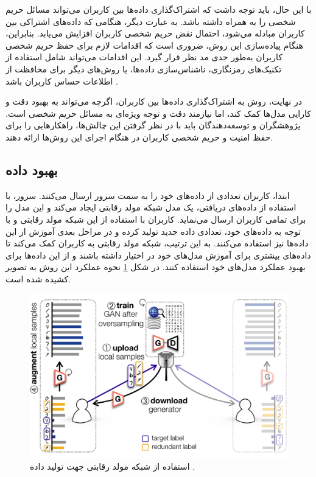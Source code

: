 با این حال، باید توجه داشت که اشتراک‌گذاری داده‌ها بین کاربران می‌تواند مسائل حریم شخصی را به همراه داشته باشد. به عبارت دیگر، هنگامی که داده‌های اشتراکی بین کاربران مبادله می‌شود، احتمال نقض حریم شخصی کاربران افزایش می‌یابد. بنابراین، هنگام پیاده‌سازی این روش، ضروری است که اقدامات لازم برای حفظ حریم شخصی کاربران به‌طور جدی مد نظر قرار گیرد. این اقدامات می‌تواند شامل استفاده از تکنیک‌های رمزنگاری، ناشناس‌سازی داده‌ها، یا روش‌های دیگر برای محافظت از اطلاعات حساس کاربران باشد
\cite{ma2022state}.

در نهایت، روش به اشتراک‌گذاری داده‌ها بین کاربران، اگرچه می‌تواند به بهبود دقت و کارایی مدل‌ها کمک کند، اما نیازمند دقت و توجه ویژه‌ای به مسائل حریم شخصی است. پژوهشگران و توسعه‌دهندگان باید با در نظر گرفتن این چالش‌ها، راهکارهایی را برای حفظ امنیت و حریم شخصی کاربران در هنگام اجرای این روش‌ها ارائه دهند.

\subsection{
	بهبود داده
}
ابتدا، کاربران تعدادی از داده‌های خود را به سمت سرور ارسال می‌کنند. سرور، با استفاده از داده‌های دریافتی، یک مدل شبکه مولد رقابتی%
ایجاد می‌کند و این مدل را برای تمامی کاربران ارسال می‌نماید. کاربران با استفاده از این شبکه مولد رقابتی و با توجه به داده‌های خود، تعدادی داده جدید تولید کرده و در مراحل بعدی آموزش از این داده‌ها نیز استفاده می‌کنند. به این ترتیب، شبکه مولد رقابتی به کاربران کمک می‌کند تا داده‌های بیشتری برای آموزش مدل‌های خود در اختیار داشته باشند و از این داده‌ها برای بهبود عملکرد مدل‌های خود استفاده کنند. در شکل
\ref{gan}
نحوه عملکرد این روش به تصویر کشیده شده است.



\begin{figure}[t]
	\centering
	\includegraphics[scale=0.9]{images/chap3/generative_adversarial_network.png}%
	\caption{%
		استفاده از شبکه مولد رقابتی جهت تولید داده
		\cite{jeong2018communication}%
		.
	}
	\label{gan}
	\centering
\end{figure}


